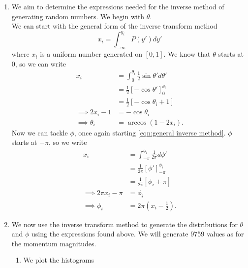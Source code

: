 \documentclass[11pt]{article}
\begin{document}
\begin{enumerate}
\begin{enumerate}
        \item We aim to determine the expressions needed for the inverse method of generating random numbers. We begin with $\theta$.\\
        We can start with the general form of the inverse transform method
        \begin{equation}
            x_i=\int_{-\infty}^{y_i}P(y')dy'
            \label{eqn:general inverse method}
        \end{equation}
        where $x_i$ is a uniform number generated on $[0,1]$. We know that $\theta$ starts at 0, so we can write
        \begin{align*}
            x_i&=\int_0^{\theta_i}\frac 12 \sin\theta' d\theta'\\
            &=\frac 12 \left[-\cos\theta'\right]_0^{\theta_i}\\
            &=\frac 12 [-\cos\theta_i+1]\\
            \implies 2x_i-1&=-\cos\theta_i\\
            \implies \theta_i&=\arccos(1-2x_i).
        \end{align*}
        Now we can tackle $\phi$, once again starting \cref{eqn:general inverse method}. $\phi$ starts at $-\pi$, so we write
        \begin{align*}
            x_i&=\int_{-\pi}^{\phi_i}\frac{1}{2\pi}d\phi'\\
            &=\frac{1}{2\pi}[\phi']_{-\pi}^{\phi_i}\\
            &=\frac{1}{2\pi}[\phi_i+\pi]\\
            \implies2\pi x_i -\pi&=\phi_i\\
            \implies \phi_i &= 2\pi\left(x_i-\frac 12\right).
        \end{align*}

        \item We now use the inverse transform method to generate the distributions for $\theta$ and $\phi$ using the expressions found above. We will generate \num{9759} values as for the momentum magnitudes.
        \begin{enumerate}
            \item We plot the histograms
            

\end{enumerate}
\end{enumerate}
\end{enumerate}
\end{document}
